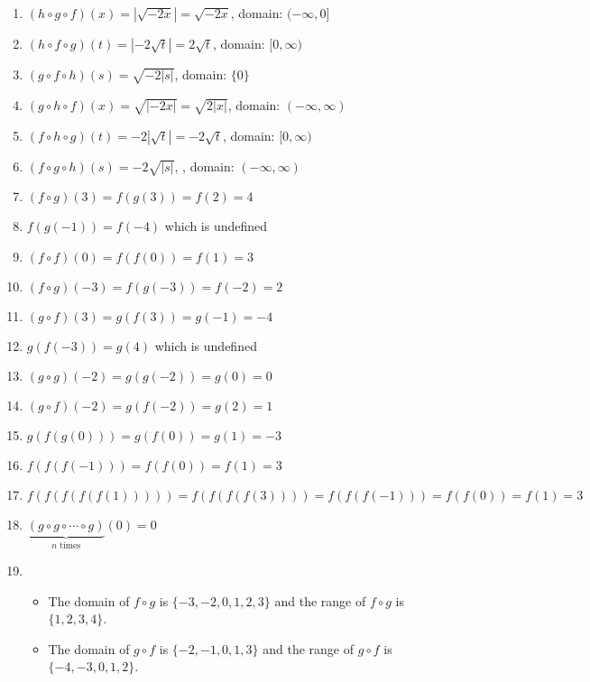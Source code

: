 \begin{enumerate}
\setcounter{enumi}{\value{HW}}

\item $(h\circ g \circ f)(x)= |\sqrt{-2x}|= \sqrt{-2x}$, domain: $(-\infty, 0]$ 

\item $(h\circ f \circ g)(t) = |-2\sqrt{t}|= 2\sqrt{t}$, domain: $[0,\infty)$

\item $(g\circ f \circ h)(s) = \sqrt{-2|s|}$, domain:  $\{0\}$

\item $(g\circ h \circ f)(x) = \sqrt{|-2x|} = \sqrt{2|x|}$, domain: $(-\infty, \infty)$ 

\item $(f\circ h \circ g)(t) = -2|\sqrt{t}| = -2\sqrt{t}$, domain: $[0,\infty)$

\item $(f\circ g \circ h)(s) = -2\sqrt{|s|}$, , domain: $(-\infty,\infty)$

\item $(f \circ g)(3)= f(g(3)) = f(2) = 4$
\item $f(g(-1)) = f(-4)$ which is undefined


\item $(f \circ f)(0) = f(f(0)) = f(1) = 3$
\item $(f \circ g)(-3) = f(g(-3)) = f(-2) = 2$


\item $(g \circ f)(3) = g(f(3)) = g(-1) = -4$
\item $g(f(-3)) = g(4)$ which is undefined

\item $(g \circ g)(-2) = g(g(-2)) = g(0) = 0$
\item $(g \circ f)(-2) = g(f(-2)) = g(2) = 1$

\item $g(f(g(0))) = g(f(0)) = g(1) = -3$
\item $f(f(f(-1))) = f(f(0)) = f(1) = 3$

\item $f(f(f(f(f(1))))) = f(f(f(f(3)))) = f(f(f(-1))) = f(f(0))  = f(1) = 3$
\item $\underbrace{(g \circ g \circ \cdots \circ g)}_{\mbox{$n$ times}}(0) = 0$

\item  \begin{itemize}  \item  The domain of $f \circ g$ is $\{ -3, -2, 0, 1, 2, 3\}$ and the range of $f \circ g$ is $\{1, 2, 3, 4\}$.
\item The domain of $g \circ f$ is $\{ -2, -1, 0, 1, 3 \}$ and the range of $g \circ f$ is $\{ -4, -3, 0, 1, 2 \}$.

\end{itemize}

\setcounter{HW}{\value{enumi}}
\end{enumerate}


